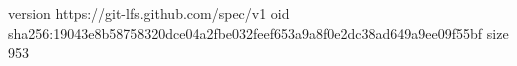 version https://git-lfs.github.com/spec/v1
oid sha256:19043e8b58758320dce04a2fbe032feef653a9a8f0e2dc38ad649a9ee09f55bf
size 953
